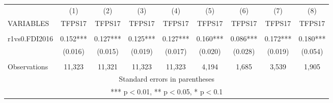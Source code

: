 \documentclass[]{article}
\begin{document}
\begin{tabular}{lcccccccc} \hline
 & (1) & (2) & (3) & (4) & (5) & (6) & (7) & (8) \\
VARIABLES & TFPS17 & TFPS17 & TFPS17 & TFPS17 & TFPS17 & TFPS17 & TFPS17 & TFPS17 \\ \hline
 &  &  &  &  &  &  &  &  \\
r1vs0.FDI2016 & 0.152*** & 0.127*** & 0.125*** & 0.127*** & 0.160*** & 0.086*** & 0.172*** & 0.180*** \\
 & (0.016) & (0.015) & (0.019) & (0.017) & (0.020) & (0.028) & (0.019) & (0.054) \\
 &  &  &  &  &  &  &  &  \\
 Observations & 11,323 & 11,321 & 11,323 & 11,323 & 4,194 & 1,685 & 3,539 & 1,905 \\ \hline
\multicolumn{9}{c}{ Standard errors in parentheses} \\
\multicolumn{9}{c}{ *** p$<$0.01, ** p$<$0.05, * p$<$0.1} \\
\end{tabular}
\end{document}
